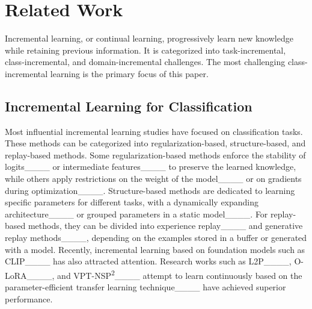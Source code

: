 \section{Related Work}

Incremental learning, or continual learning, progressively learn new knowledge while retaining previous information. It is categorized into task-incremental, class-incremental, and domain-incremental challenges. The most challenging class-incremental learning is the primary focus of this paper.

\subsection{Incremental Learning for Classification}
Most influential incremental learning studies have focused on classification tasks. 
These methods can be categorized into regularization-based, structure-based, and replay-based methods. 
Some regularization-based methods enforce the stability of logits____ or intermediate features____ to preserve the learned knowledge, while others apply restrictions on the weight of the model____ or on gradients during optimization____. 
Structure-based methods are dedicated to learning specific parameters for different tasks, with a dynamically expanding architecture____ or grouped parameters in a static model____. 
For replay-based methods, they can be divided into experience replay____ and generative replay methods____, depending on the examples stored in a buffer or generated with a model. 
Recently, incremental learning based on foundation models such as CLIP____ has also attracted attention. 
Research works such as L2P____, O-LoRA____, and VPT-NSP\textsuperscript{2}____ attempt to learn continuously based on the parameter-efficient transfer learning technique____ have achieved superior performance.

